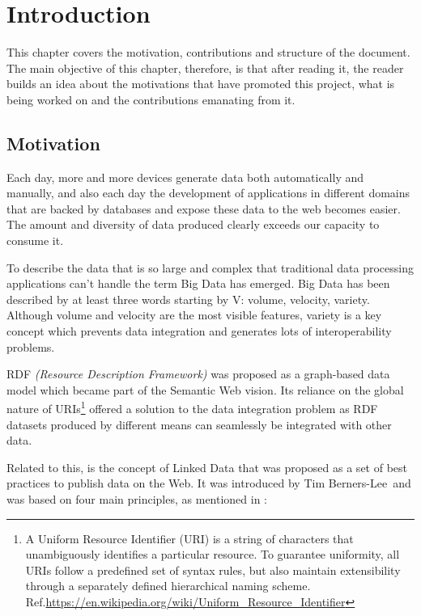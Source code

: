 \chapter{Introduction}
\label{ch:intro}

This chapter covers the motivation, contributions and structure of the document.
The main objective of this chapter, therefore, is that after reading it, the reader
builds an idea about the motivations that have promoted this project, what is
being worked on and the contributions emanating from it.


\section{Motivation}
\label{sec:intro-motiv}

Each day, more and more devices generate data both automatically and manually, and also each day the development of
applications in different domains that are backed by databases and expose these data to the web becomes easier. The
amount and diversity of data produced clearly exceeds our capacity to consume it.

To describe the data that is so large and complex that traditional data processing applications can’t handle the
term Big Data \cite{big-data,sagiroglu2013big} has emerged. Big Data has been described by at least three words starting
by V: volume, velocity, variety. Although volume and velocity are the most visible features, variety is a key concept
which prevents data integration and generates lots of interoperability problems.

RDF \textit{(Resource Description Framework)} was proposed as a graph-based data model
\cite{graph-data-model} which became part of the Semantic Web \cite{semantic-web} vision.
Its reliance on the global nature of URIs\footnote{A Uniform Resource Identifier (URI) is a string of
characters that unambiguously identifies a particular resource. To guarantee uniformity, all URIs follow a predefined
set of syntax rules, but also maintain extensibility through a separately defined hierarchical naming scheme.
Ref.\url{https://en.wikipedia.org/wiki/Uniform_Resource_Identifier}} offered a solution to the data integration
problem as RDF datasets produced by different means can seamlessly be integrated with other data.

Related to this, is the concept of Linked Data \cite{linked-data} that was proposed as a set of best
practices to publish data on the Web. It was introduced by Tim Berners-Lee and was based on four main principles,
as mentioned in \cite{linked-data}:

